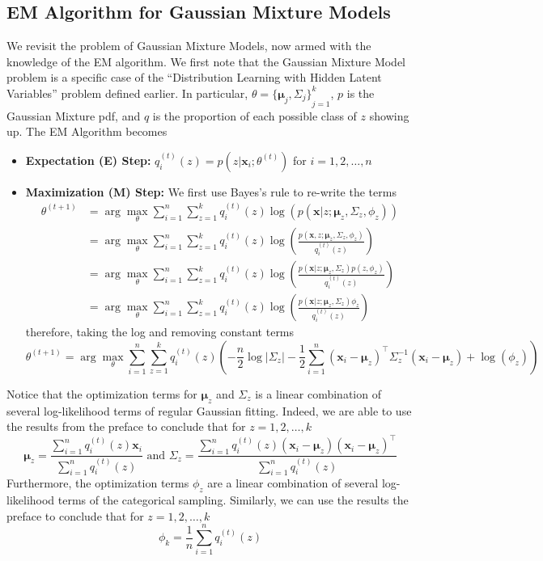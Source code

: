 \subsection{EM Algorithm for Gaussian Mixture Models}
We revisit the problem of Gaussian Mixture Models, now armed with the knowledge of the EM algorithm. We first note that the Gaussian Mixture Model problem is a specific case of the ``Distribution Learning with Hidden Latent Variables'' problem defined earlier. In particular, $\theta={\{\boldsymbol{\mu}_j,\Sigma_j\}}_{j=1}^k$, $p$ is the Gaussian Mixture pdf, and $q$ is the proportion of each possible class of $z$ showing up. The EM Algorithm becomes
\begin{itemize}
    \item \textbf{Expectation (E) Step:} $q_i^{(t)}(z)=p(z|\mathbf{x}_i;\theta^{(t)})$ for $i=1,2,\dots,n$
    \item \textbf{Maximization (M) Step:} We first use Bayes's rule to re-write the terms
    \begin{align*}
        \theta^{(t+1)} 
        &= \arg\max_{\theta} \sum_{i=1}^n \sum_{z=1}^k q_i^{(t)}(z) \log(p(\mathbf{x}|z;\boldsymbol{\mu}_z,\Sigma_z,\phi_z)) \\
        &= \arg\max_{\theta} \sum_{i=1}^n \sum_{z=1}^k q_i^{(t)}(z) \log\left(\frac{p(\mathbf{x},z;\boldsymbol{\mu}_z,\Sigma_z,\phi_z)}{q_i^{(t)}(z)}\right) \\
        &= \arg\max_{\theta} \sum_{i=1}^n \sum_{z=1}^k q_i^{(t)}(z) \log\left(\frac{p(\mathbf{x}|z;\boldsymbol{\mu}_z,\Sigma_z)p(z,\phi_z)}{q_i^{(t)}(z)}\right) \\
        &= \arg\max_{\theta} \sum_{i=1}^n \sum_{z=1}^k q_i^{(t)}(z) \log\left(\frac{p(\mathbf{x}|z;\boldsymbol{\mu}_z,\Sigma_z)\phi_z}{q_i^{(t)}(z)}\right)
    \end{align*}
    therefore, taking the log and removing constant terms
    \[
        \theta^{(t+1)} = \arg\max_{\theta} \sum_{i=1}^n \sum_{z=1}^k q_i^{(t)}(z) 
        \left(
            -\frac{n}{2} \log |\Sigma_z|
            - \frac{1}{2} \sum_{i=1}^n (\mathbf{x}_i - \boldsymbol{\mu}_z)^\top \Sigma_z^{-1} (\mathbf{x}_i - \boldsymbol{\mu}_z)
            + \log(\phi_z)
        \right)
    \]
\end{itemize}
Notice that the optimization terms for $\boldsymbol{\mu}_z$ and $\Sigma_z$ is a linear combination of several log-likelihood terms of regular Gaussian fitting. Indeed, we are able to use the results from the preface to conclude that for $z=1,2,\dots,k$
\[
\boldsymbol{\mu}_z = \frac{\sum_{i=1}^n q_i^{(t)}(z) \mathbf{x}_i}{\sum_{i=1}^n q_i^{(t)}(z)}
\text{ and }
\Sigma_z = \frac{\sum_{i=1}^n q_i^{(t)}(z) (\mathbf{x}_i-\boldsymbol{\mu}_z)(\mathbf{x}_i-\boldsymbol{\mu}_z)^\top}{\sum_{i=1}^n q_i^{(t)}(z)}
\]
Furthermore, the optimization terms $\phi_z$ are a linear combination of several log-likelihood terms of the categorical sampling. Similarly, we can use the results the preface to conclude that for $z=1,2,\dots,k$
\[
\phi_k = \frac{1}{n} \sum_{i=1}^n q_i^{(t)}(z)
\]
